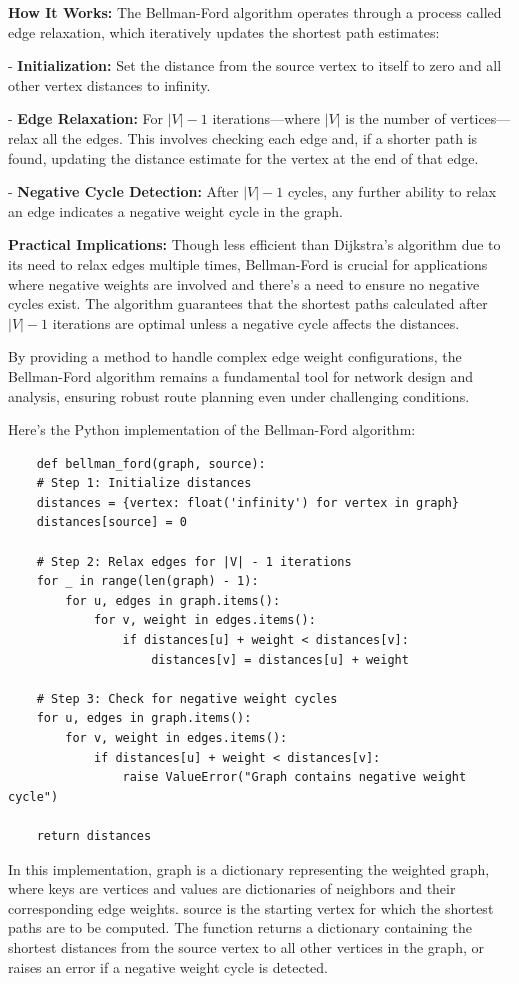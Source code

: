 \documentclass[12pt]{book} %
\begin{document}
\textbf{How It Works:}
The Bellman-Ford algorithm operates through a process called edge relaxation, which iteratively updates the shortest path estimates:

- \textbf{Initialization:} Set the distance from the source vertex to itself to zero and all other vertex distances to infinity.

- \textbf{Edge Relaxation:} For \(|V|-1\) iterations—where \(|V|\) is the number of vertices—relax all the edges. This involves checking each edge and, if a shorter path is found, updating the distance estimate for the vertex at the end of that edge.

- \textbf{Negative Cycle Detection:} After \(|V|-1\) cycles, any further ability to relax an edge indicates a negative weight cycle in the graph.

\textbf{Practical Implications:}
Though less efficient than Dijkstra's algorithm due to its need to relax edges multiple times, Bellman-Ford is crucial for applications where negative weights are involved and there's a need to ensure no negative cycles exist. The algorithm guarantees that the shortest paths calculated after \(|V|-1\) iterations are optimal unless a negative cycle affects the distances.

By providing a method to handle complex edge weight configurations, the Bellman-Ford algorithm remains a fundamental tool for network design and analysis, ensuring robust route planning even under challenging conditions.


Here's the Python implementation of the Bellman-Ford algorithm:
\FloatBarrier
\begin{lstlisting}
    def bellman_ford(graph, source):
    # Step 1: Initialize distances
    distances = {vertex: float('infinity') for vertex in graph}
    distances[source] = 0
    
    # Step 2: Relax edges for |V| - 1 iterations
    for _ in range(len(graph) - 1):
        for u, edges in graph.items():
            for v, weight in edges.items():
                if distances[u] + weight < distances[v]:
                    distances[v] = distances[u] + weight
    
    # Step 3: Check for negative weight cycles
    for u, edges in graph.items():
        for v, weight in edges.items():
            if distances[u] + weight < distances[v]:
                raise ValueError("Graph contains negative weight cycle")
    
    return distances
\end{lstlisting}
\FloatBarrier
In this implementation, graph is a dictionary representing the weighted graph, where keys are vertices and values are dictionaries of neighbors and their corresponding edge weights. source is the starting vertex for which the shortest paths are to be computed. The function returns a dictionary containing the shortest distances from the source vertex to all other vertices in the graph, or raises an error if a negative weight cycle is detected.
\end{document}
